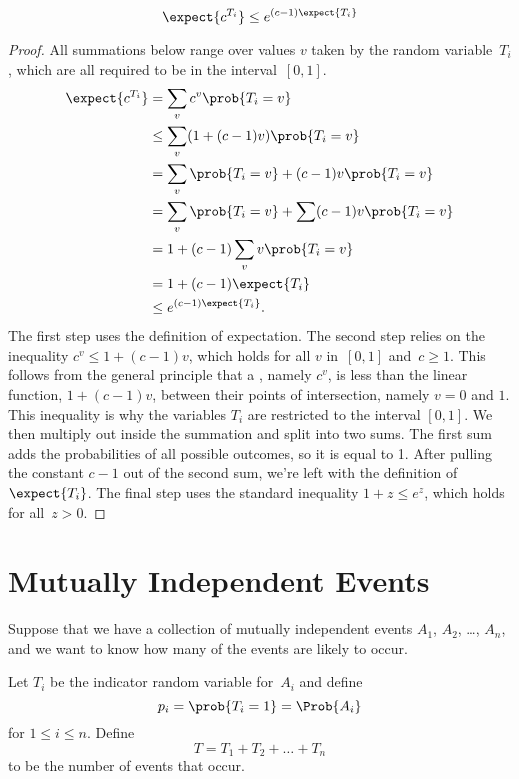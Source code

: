 \begin{lemma}
\label{chernoff-lemma2}
\[
    \expect{c^{T_i}} \leq e^{(c - 1) \expect{T_i}}
\]
\end{lemma}

\begin{proof}
All summations below range over values $v$ taken by the random
variable~$T_i$, which are all required to be in the interval~$[0, 1]$.
\begin{align*}
\expect{c^{T_i}} & = \sum_v c^v \prob{T_i = v} \\
           & \leq \sum_v (1 + (c-1) v) \prob{T_i = v} \\
           & = \sum_v \prob{T_i = v} + (c-1) v \prob{T_i = v} \\
           & = \sum_v \prob{T_i = v} + \sum(c-1) v \prob{T_i = v} \\
           & = 1 + (c - 1) \sum_v v \prob{T_i = v} \\
           & = 1 + (c - 1) \expect{T_i} \\
           & \leq e^{(c - 1) \expect{T_i}}.
\end{align*}
The first step uses the definition of expectation.  The second step
relies on the inequality $c^v \leq 1 + (c-1) v$, which holds for all
$v$ in~$[0,1]$ and~$c \geq 1$.  This follows from the general
principle that a , namely $c^v$, is less than the
linear function, $1 + (c-1) v$, between their points of intersection,
namely $v = 0$ and $1$.  This inequality is why the variables $T_i$
are restricted to the interval $[0, 1]$.  We then multiply out inside
the summation and split into two sums.  The first sum adds the
probabilities of all possible outcomes, so it is equal to 1.  After
pulling the constant $c - 1$ out of the second sum, we're left with
the definition of $\expect{T_i}$.  The final step uses the standard
inequality $1 + z \leq e^z$, which holds for all~$z > 0$.
\end{proof}

\section{Mutually Independent Events}

Suppose that we have a collection of mutually independent events $A_1$,
$A_2$, \dots, $A_n$, and we want to know how many of the events are
likely to occur.

Let $T_i$ be the indicator random variable for~$A_i$ and define
\begin{equation*}
    p_i = \prob{T_i = 1} = \Prob{A_i}
\end{equation*}
for $1 \le i \le n$.  Define
\begin{equation*}
    T = T_1 + T_2 + \dots + T_n
\end{equation*}
to be the number of events that occur.

